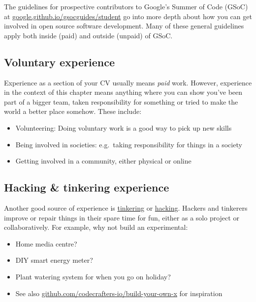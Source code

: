 \documentclass[
]{book}
\providecommand{\tightlist}{%
  \setlength{\itemsep}{0pt}\setlength{\parskip}{0pt}}
\begin{document}
The guidelines for prospective contributors to Google's Summer of Code (GSoC) at \href{https://google.github.io/gsocguides/student/}{google.github.io/gsocguides/student} go into more depth about how you can get involved in open source software development. Many of these general guidelines apply both inside (paid) and outside (unpaid) of GSoC. \citep{gsoc}

\hypertarget{volunteering}{%
\subsection{Voluntary experience}\label{volunteering}}

Experience as a section of your CV usually means \emph{paid} work. However, experience in the context of this chapter means anything where you can show you've been part of a bigger team, taken responsibility for something or tried to make the world a better place somehow. These include:

\begin{itemize}
\tightlist
\item
  Volunteering: Doing voluntary work is a good way to pick up new skills
\item
  Being involved in societies: e.g.~taking responsibility for things in a society
\item
  Getting involved in a community, either physical or online
\end{itemize}

\hypertarget{tinkering}{%
\subsection{Hacking \& tinkering experience}\label{tinkering}}

Another good source of experience is \href{https://en.wikipedia.org/wiki/Tinker}{tinkering} or \href{https://en.wikipedia.org/wiki/Hacker_culture}{hacking}. Hackers and tinkerers improve or repair things in their spare time for fun, either as a solo project or collaboratively. For example, why not build an experimental:

\begin{itemize}
\tightlist
\item
  Home media centre?
\item
  DIY smart energy meter?
\item
  Plant watering system for when you go on holiday?
\item
  See also \href{https://github.com/codecrafters-io/build-your-own-x}{github.com/codecrafters-io/build-your-own-x} for inspiration
\end{itemize}
\end{document}
